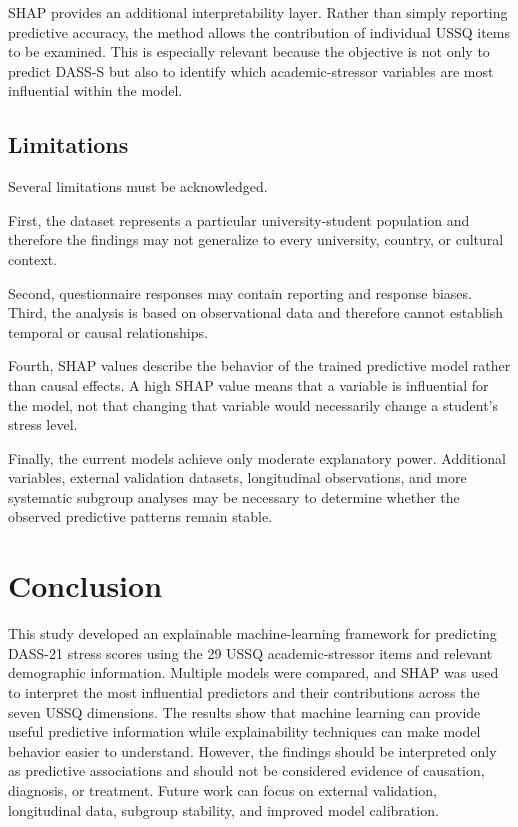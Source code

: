 \documentclass[conference]{IEEEtran}
\begin{document}
SHAP provides an additional interpretability layer. Rather than simply reporting predictive accuracy, the method allows the contribution of individual USSQ items to be examined. This is especially relevant because the objective is not only to predict DASS-S but also to identify which academic-stressor variables are most influential within the model.

\subsection{Limitations}

Several limitations must be acknowledged.

First, the dataset represents a particular university-student population and therefore the findings may not generalize to every university, country, or cultural context.

Second, questionnaire responses may contain reporting and response biases. Third, the analysis is based on observational data and therefore cannot establish temporal or causal relationships.

Fourth, SHAP values describe the behavior of the trained predictive model rather than causal effects. A high SHAP value means that a variable is influential for the model, not that changing that variable would necessarily change a student's stress level.

Finally, the current models achieve only moderate explanatory power. Additional variables, external validation datasets, longitudinal observations, and more systematic subgroup analyses may be necessary to determine whether the observed predictive patterns remain stable.


\section{Conclusion}

This study developed an explainable machine-learning framework for predicting DASS-21 stress scores using the 29 USSQ academic-stressor items and relevant demographic information. Multiple models were compared, and SHAP was used to interpret the most influential predictors and their contributions across the seven USSQ dimensions. The results show that machine learning can provide useful predictive information while explainability techniques can make model behavior easier to understand. However, the findings should be interpreted only as predictive associations and should not be considered evidence of causation, diagnosis, or treatment. Future work can focus on external validation, longitudinal data, subgroup stability, and improved model calibration.
\end{document}

